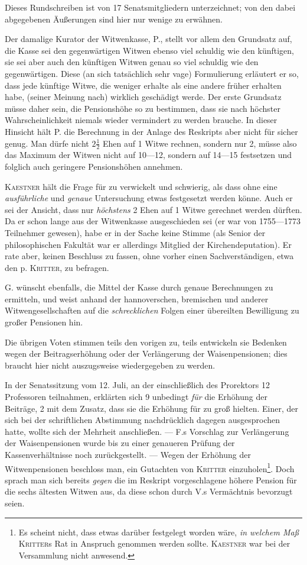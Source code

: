 Dieses Rundschreiben ist von 17 Senatsmitgliedern unterzeichnet; von den dabei abgegebenen Äußerungen sind hier nur wenige zu erwähnen.

Der damalige Kurator der Witwenkasse, P., stellt vor allem den Grundsatz auf, die Kasse sei den gegenwärtigen Witwen ebenso viel schuldig wie den künftigen, sie sei aber auch den künftigen Witwen genau so viel schuldig wie den gegenwärtigen. Diese (an sich tatsächlich sehr vage) Formulierung erläutert er so, dass jede künftige Witwe, die weniger erhalte als eine andere früher erhalten habe, (seiner Meinung nach) wirklich geschädigt werde. Der erste Grundsatz müsse daher sein, die Pensionshöhe so zu bestimmen, dass sie nach höchster Wahrscheinlichkeit niemals wieder vermindert zu werden brauche. In dieser Hinsicht hält P. die Berechnung in der Anlage des Reskripts aber nicht für sicher genug. Man dürfe nicht \(2\tfrac12\) Ehen auf 1 Witwe rechnen, sondern nur 2, müsse also das Maximum der Witwen nicht auf 10—12, sondern auf 14—15 festsetzen und folglich auch geringere Pensionshöhen annehmen.

\textsc{Kaestner} hält die Frage für zu verwickelt und schwierig, als dass ohne eine \textit{ausführliche} und \textit{genaue} Untersuchung etwas festgesetzt werden könne. Auch er sei der Ansicht, dass nur \textit{höchstens} 2 Ehen auf 1 Witwe gerechnet werden dürften. Da er schon lange aus der Witwenkasse ausgeschieden sei (er war von 1755—1773 Teilnehmer gewesen), habe er in der Sache keine Stimme (als Senior der philosophischen Fakultät war er allerdings Mitglied der Kirchendeputation). Er rate aber, keinen Beschluss zu fassen, ohne vorher einen Sachverständigen, etwa den p. \textsc{Kritter}, zu befragen.

G. wünscht ebenfalls, die Mittel der Kasse durch genaue Berechnungen zu ermitteln, und weist anhand der hannoverschen, bremischen und anderer Witwengesellschaften auf die \textit{schrecklichen} Folgen einer übereilten Bewilligung zu großer Pensionen hin.

Die übrigen Voten stimmen teils den vorigen zu, teils entwickeln sie Bedenken wegen der Beitragserhöhung oder der Verlängerung der Waisenpensionen; dies braucht hier nicht auszugsweise wiedergegeben zu werden.

In der Senatssitzung vom 12. Juli, an der einschließlich des Prorektors 12 Professoren teilnahmen, erklärten sich 9 unbedingt \textit{für} die Erhöhung der Beiträge, 2 mit dem Zusatz, dass sie die Erhöhung für zu groß hielten. Einer, der sich bei der schriftlichen Abstimmung nachdrücklich dagegen ausgesprochen hatte, wollte sich der Mehrheit anschließen. — F.s Vorschlag zur Verlängerung der Waisenpensionen wurde bis zu einer genaueren Prüfung der Kassenverhältnisse noch zurückgestellt. — Wegen der
Erhöhung der Witwenpensionen beschloss man, ein Gutachten von \textsc{Kritter} einzuholen\footnote{Es scheint nicht, dass etwas darüber festgelegt worden wäre, \textit{in welchem Maß} \textsc{Kritter}s Rat in Anspruch genommen werden sollte. \textsc{Kaestner} war bei der Versammlung nicht anwesend.}. Doch sprach man sich bereits \textit{gegen} die im Reskript vorgeschlagene höhere Pension für die sechs ältesten Witwen aus, da diese schon durch V.s Vermächtnis bevorzugt seien.

